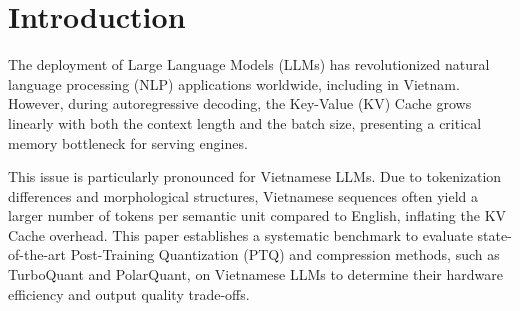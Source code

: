 \section{Introduction}
\label{sec:intro}

The deployment of Large Language Models (LLMs) has revolutionized natural language processing (NLP) applications worldwide, including in Vietnam. However, during autoregressive decoding, the Key-Value (KV) Cache grows linearly with both the context length and the batch size, presenting a critical memory bottleneck for serving engines. 

This issue is particularly pronounced for Vietnamese LLMs. Due to tokenization differences and morphological structures, Vietnamese sequences often yield a larger number of tokens per semantic unit compared to English, inflating the KV Cache overhead. This paper establishes a systematic benchmark to evaluate state-of-the-art Post-Training Quantization (PTQ) and compression methods, such as TurboQuant and PolarQuant, on Vietnamese LLMs to determine their hardware efficiency and output quality trade-offs.
